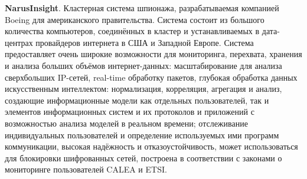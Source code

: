 	
	\textbf{NarusInsight}. Кластерная система шпионажа, разрабатываемая компанией Boeing для американского правительства. %
	Система состоит из большого количества компьютеров, соединённых в кластер и устанавливаемых в дата-центрах провайдеров интернета в США и Западной Европе. Система предоставляет очень широкие возможности для мониторинга, перехвата, хранения и анализа больших объёмов интернет-данных: масштабирование для анализа  сверхбольших IP-сетей, real-time обработку пакетов,  глубокая обработка данных искусственным интеллектом: нормализация, корреляция, агрегация и анализ, создающие информационные модели как отдельных пользователей, так и элементов информационных систем и их протоколов и приложений с возможностью анализа моделей в реальном времени; отслеживание индивидуальных пользователей и определение используемых  ими программ коммуникации, высокая надёжность и отказоустойчивость, может использоваться для блокировки шифрованных сетей,  построена в соответствии с законами о мониторинге пользователей CALEA и ETSI.
\newpage